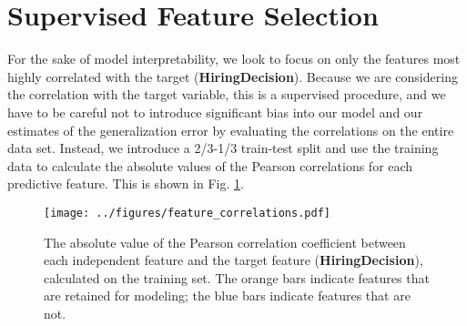 \documentclass[12pt]{article}
\begin{document}
\section{Supervised Feature Selection}

%
%
%
%
%

For the sake of model interpretability, we look to focus on only the features most highly correlated with the target ({\bf HiringDecision}). Because we are considering the correlation with the target variable, this is a supervised procedure, and we have to be careful not to introduce significant bias into our model and our estimates of the generalization error by evaluating the correlations on the entire data set. Instead, we introduce a 2/3-1/3 train-test split and use the training data to calculate the absolute values of the Pearson correlations for each predictive feature. This is shown in Fig. \ref{fig:correlations}.

\begin{figure}[H]
    \centerline{\texttt{[image: ../figures/feature\_correlations.pdf]}}
    \caption{The absolute value of the Pearson correlation coefficient between each independent feature and the target feature ({\bf HiringDecision}), calculated on the training set. The orange bars indicate features that are retained for modeling; the blue bars indicate features that are not.}
    \label{fig:correlations}
\end{figure}
\end{document}
